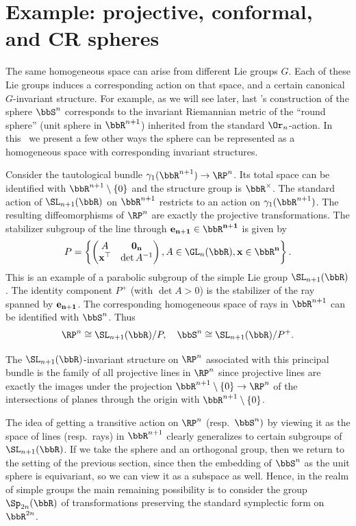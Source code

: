 \section{Example: projective, conformal, and CR spheres}\label{sec: projective, conformal CR spheres}

The same homogeneous space can arise from different Lie groups $G$. Each of these Lie groups induces a corresponding action on that space, and a certain canonical $G$-invariant structure. For example, as we will see later, last \sect's construction of the sphere $\bbS^n$ corresponds to the invariant Riemannian metric of the ``round sphere'' (unit sphere in $\bbR^{n+1}$) inherited from the standard $\Or_n$-action. In this \sect\ we present a few other ways the sphere can be represented as a homogeneous space with corresponding invariant structures.

\begin{defn}
    Consider the tautological bundle $\gamma_1(\bbR^{n+1})\to \RP^n$. Its total space can be identified with $\bbR^{n+1}\setminus\{0\}$ and the structure group is $\bbR^\times$. The standard action of $\SL_{n+1}(\bbR)$ on $\bbR^{n+1}$ restricts to an action on $\gamma_1(\bbR^{n+1})$. The resulting diffeomorphisms of $\RP^n$ are exactly the projective transformations. The stabilizer subgroup of the line through $\bf{e}_{n+1}\in\bbR^{n+1}$ is given by
    \[P=\left\{\begin{pmatrix}
        A&\bf{0}_n\\
        \bf{x}^\top &\det A^{-1}\end{pmatrix}, A\in\GL_n(\bbR),\bf{x}\in\bbR^{n}\right\}.\]
    This is an example of a parabolic subgroup of the simple Lie group $\SL_{n+1}(\bbR)$. 
    The identity component $P^+$ (with $\det A>0$) is the stabilizer of the ray spanned by $\bf{e}_{n+1}$. The corresponding homogeneous space of rays in $\bbR^{n+1}$ can be identified with $\bbS^n$.
    Thus
    \[\RP^n\cong \SL_{n+1}(\bbR)\slash P,\quad \bbS^n\cong  \SL_{n+1}(\bbR)\slash P^+.\]
\end{defn}

The $\SL_{n+1}(\bbR)$-invariant structure on $\RP^n$ associated with this principal bundle is the family of all projective lines in $\RP^n$ since projective lines are exactly the images under the projection $\bbR^{n+1}\setminus\{0\}\to \RP^n$ of the intersections of planes through the origin with $\bbR^{n+1}\setminus\{0\}$.

The idea of getting a transitive action on $\RP^n$ (resp.~$\bbS^n)$ by viewing it as the space of lines (resp.~rays) in $\bbR^{n+1}$ clearly generalizes to certain subgroups of $\SL_{n+1}(\bbR)$. If we take the sphere and an orthogonal group, then we return to the setting of the previous section, since then the embedding of $\bbS^n$ as the unit sphere is equivariant, so we can view it as a subspace as well. Hence, in the realm of simple groups the main remaining possibility is to consider the group $\Sp_{2n}(\bbR)$ of transformations preserving the standard symplectic form on $\bbR^{2n}$.

